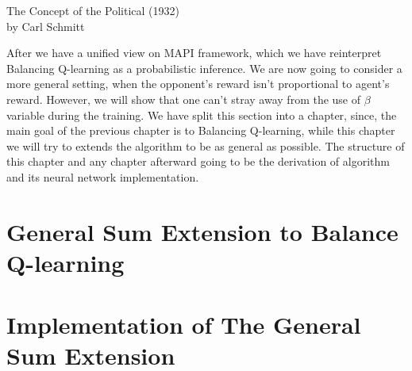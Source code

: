 \label{chapter:chap4}
\epigraph{}{The Concept of the Political (1932) \\ by Carl Schmitt}

\begin{miniabstract}
After we have a unified view on MAPI framework, which we have reinterpret Balancing Q-learning \cite{grau2018balancing} as a probabilistic inference. We are now going to consider a more general setting, when the opponent's reward isn't proportional to agent's reward. However, we will show that one can't stray away from the use of $\beta$ variable during the training. We have split this section into a chapter, since, the main goal of the previous chapter is to  Balancing Q-learning, while this chapter we will try to extends the algorithm to be as general as possible. The structure of this chapter and any chapter afterward going to be the derivation of algorithm and its neural network implementation.
\end{miniabstract}

\section{General Sum Extension to Balance Q-learning}


\section{Implementation of The General Sum Extension}
